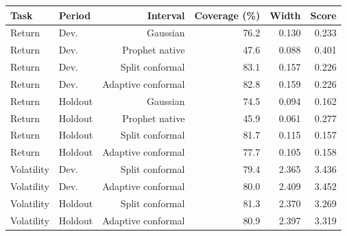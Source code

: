 \begin{tabular}{llrrrr}
\toprule
Task & Period & Interval & Coverage (\%) & Width & Score \\
\midrule
Return & Dev. & Gaussian & 76.2 & 0.130 & 0.233 \\
Return & Dev. & Prophet native & 47.6 & 0.088 & 0.401 \\
Return & Dev. & Split conformal & 83.1 & 0.157 & 0.226 \\
Return & Dev. & Adaptive conformal & 82.8 & 0.159 & 0.226 \\
Return & Holdout & Gaussian & 74.5 & 0.094 & 0.162 \\
Return & Holdout & Prophet native & 45.9 & 0.061 & 0.277 \\
Return & Holdout & Split conformal & 81.7 & 0.115 & 0.157 \\
Return & Holdout & Adaptive conformal & 77.7 & 0.105 & 0.158 \\
Volatility & Dev. & Split conformal & 79.4 & 2.365 & 3.436 \\
Volatility & Dev. & Adaptive conformal & 80.0 & 2.409 & 3.452 \\
Volatility & Holdout & Split conformal & 81.3 & 2.370 & 3.269 \\
Volatility & Holdout & Adaptive conformal & 80.9 & 2.397 & 3.319 \\
\bottomrule
\end{tabular}

